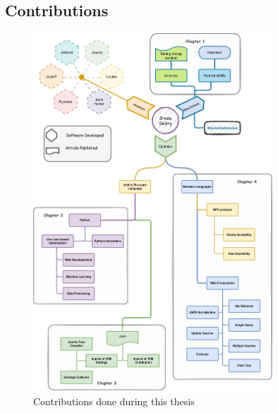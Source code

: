 \subsection*{Contributions}
\begin{figure}[!h]

    \centering
    \includegraphics[width=0.8\textwidth,height=\textheight,keepaspectratio]{chapters/thesis_contributions.pdf}
    \caption{Contributions done during this thesis }
    \label{fig:thesis_contributions}
\end{figure}







